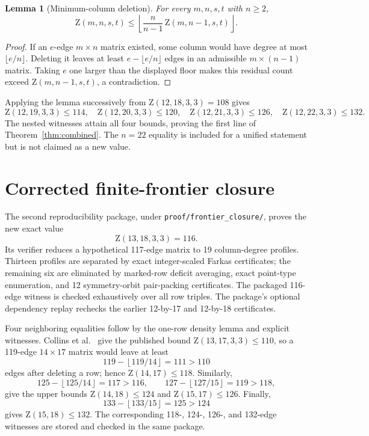 \documentclass[11pt]{amsart}
\newtheorem{lemma}[theorem]{Lemma}
\newcommand{\Z}{\mathrm Z}
\begin{document}
\begin{lemma}[Minimum-column deletion]
\label{lem:min-column}
For every $m,n,s,t$ with $n\ge2$,
\[
  \Z(m,n,s,t)\le
  \left\lfloor\frac{n}{n-1}\,\Z(m,n-1,s,t)\right\rfloor.
\]
\end{lemma}
\begin{proof}
If an $e$-edge $m\times n$ matrix existed, some column would have degree at
most $\lfloor e/n\rfloor$. Deleting it leaves at least
$e-\lfloor e/n\rfloor$ edges in an admissible $m\times(n-1)$ matrix. Taking
$e$ one larger than the displayed floor makes this residual count exceed
$\Z(m,n-1,s,t)$, a contradiction.
\end{proof}

Applying the lemma successively from $\Z(12,18,3,3)=108$ gives
\[
\Z(12,19,3,3)\le114,\quad
\Z(12,20,3,3)\le120,\quad
\Z(12,21,3,3)\le126,\quad
\Z(12,22,3,3)\le132.
\]
The nested witnesses attain all four bounds, proving the first line of
Theorem~\ref{thm:combined}. The $n=22$ equality is included for a unified
statement but is not claimed as a new value.

\section{Corrected finite-frontier closure}
\label{sec:frontier}

The second reproducibility package, under
\texttt{proof/frontier\_closure/}, proves the new exact value
\[
  \Z(13,18,3,3)=116.
\]
Its verifier reduces a hypothetical 117-edge matrix to 19 column-degree
profiles. Thirteen profiles are separated by exact integer-scaled Farkas
certificates; the remaining six are eliminated by marked-row deficit
averaging, exact point-type enumeration, and 12 symmetry-orbit pair-packing
certificates. The packaged 116-edge witness is checked exhaustively over all
row triples. The package's optional dependency replay rechecks the earlier
12-by-17 and 12-by-18 certificates.

Four neighboring equalities follow by the one-row density lemma and explicit
witnesses. Collins et al.~\cite{CollinsRiasanovskyWallaceRadziszowski2016}
give the published bound $\Z(13,17,3,3)\le110$, so a 119-edge $14\times17$
matrix would leave at least
\[
119-\left\lfloor119/14\right\rfloor=111>110
\]
edges after deleting a row; hence $\Z(14,17)\le118$. Similarly,
\[
125-\left\lfloor125/14\right\rfloor=117>116,
\qquad
127-\left\lfloor127/15\right\rfloor=119>118,
\]
give the upper bounds $\Z(14,18)\le124$ and $\Z(15,17)\le126$.
Finally,
\[
133-\left\lfloor133/15\right\rfloor=125>124
\]
gives $\Z(15,18)\le132$. The corresponding 118-, 124-, 126-, and 132-edge
witnesses are stored and checked in the same package.
\end{document}
